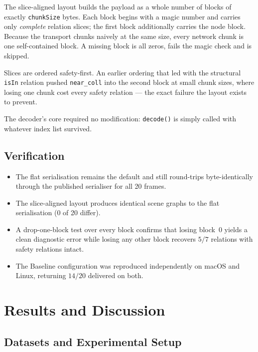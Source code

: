 \documentclass{iutbscthesis}
\begin{document}
The slice-aligned layout builds the payload as a whole number of blocks of
exactly \texttt{chunkSize} bytes. Each block begins with a magic number and
carries only \emph{complete} relation slices; the first block additionally
carries the node block. Because the transport chunks naively at the same size,
every network chunk is one self-contained block. A missing block is all zeros,
fails the magic check and is skipped.

Slices are ordered safety-first. An earlier ordering that led with the
structural \texttt{isIn} relation pushed \texttt{near\_coll} into the second
block at small chunk sizes, where losing one chunk cost every safety relation
--- the exact failure the layout exists to prevent.

The decoder's core required no modification: \texttt{decode()} is simply called
with whatever index list survived.

\section{Verification}

\begin{itemize}
    \item The flat serialisation remains the default and still round-trips
    byte-identically through the published serialiser for all 20 frames.
    \item The slice-aligned layout produces identical scene graphs to the flat
    serialisation (0 of 20 differ).
    \item A drop-one-block test over every block confirms that losing block~0
    yields a clean diagnostic error while losing any other block recovers
    $5/7$ relations with safety relations intact.
    \item The Baseline configuration was reproduced independently on macOS and
    Linux, returning $14/20$ delivered on both.
\end{itemize}

\chapter{Results and Discussion} \label{chapter:results}

\section{Datasets and Experimental Setup}
\end{document}
